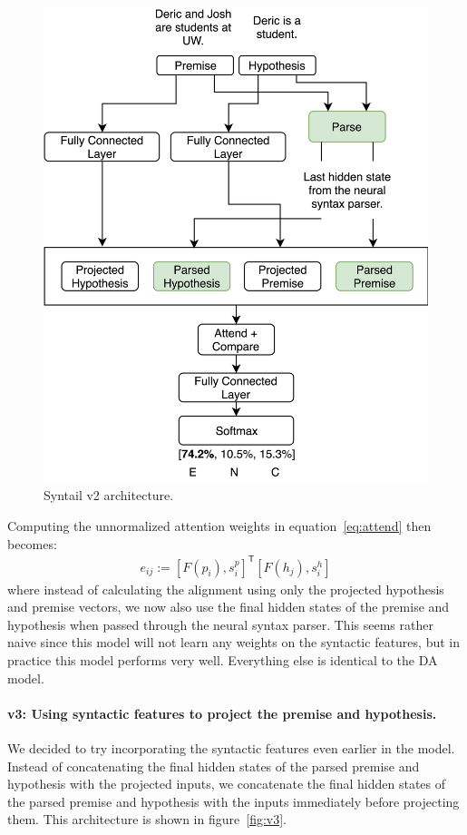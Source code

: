 \documentclass[11pt,a4paper]{article}
\begin{document}
\begin{figure}[h]
    \centering
    \includegraphics[width=\linewidth]{figures/v2.png}
    \caption{Syntail v2 architecture.}
\label{fig:v2}
\end{figure}

Computing the
unnormalized attention weights in equation~\ref{eq:attend} then becomes:
\begin{align}
    e_{ij} := [F(p_i), s^p_i]^\mathsf{T} [F(h_j), s^h_i]
\end{align}
where instead of calculating the alignment using only the 
projected hypothesis and premise vectors, we now also use the final hidden states of
the premise and hypothesis when passed through the neural syntax parser.
This seems rather naive since this model will not
learn any weights on the syntactic features, but in practice this model
performs very well. Everything else is identical to the DA model.

\paragraph{v3: Using syntactic features to project the premise and hypothesis.}
We decided to try incorporating the syntactic features even earlier in the model.
Instead of concatenating the final hidden states of the parsed premise and hypothesis
with the projected inputs, we concatenate the final hidden states of the parsed
premise and hypothesis with the inputs immediately before projecting them. This
architecture is shown in figure~\ref{fig:v3}.
\end{document}
